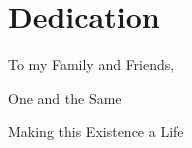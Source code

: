 
\chapter*{Dedication}\label{dedication}
\vspace{7mm}

\begin{center}

To my Family and Friends,
\vspace{7mm}

One and the Same
\vspace{7mm}

Making this Existence a Life
\vspace{7mm}


    
\end{center}